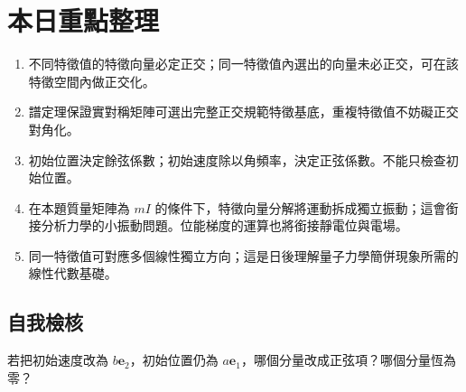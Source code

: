 \documentclass[12pt,a4paper]{article}
\begin{document}
\section{本日重點整理}
\begin{enumerate}
  \item 不同特徵值的特徵向量必定正交；同一特徵值內選出的向量未必正交，可在該特徵空間內做正交化。
  \item 譜定理保證實對稱矩陣可選出完整正交規範特徵基底，重複特徵值不妨礙正交對角化。
  \item 初始位置決定餘弦係數；初始速度除以角頻率，決定正弦係數。不能只檢查初始位置。
  \item 在本題質量矩陣為 \(mI\) 的條件下，特徵向量分解將運動拆成獨立振動；這會銜接分析力學的小振動問題。位能梯度的運算也將銜接靜電位與電場。
  \item 同一特徵值可對應多個線性獨立方向；這是日後理解量子力學簡併現象所需的線性代數基礎。
\end{enumerate}
\subsection*{自我檢核}
若把初始速度改為 \(b\mathbf e_2\)，初始位置仍為 \(a\mathbf e_1\)，哪個分量改成正弦項？哪個分量恆為零？
\end{document}
